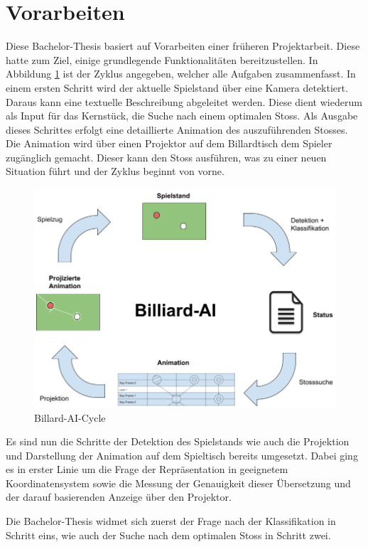 \section{Vorarbeiten}\label{kap:vorarbeiten}
Diese Bachelor-Thesis basiert auf Vorarbeiten einer früheren Projektarbeit. Diese hatte zum Ziel, einige
grundlegende Funktionalitäten bereitzustellen. In Abbildung \ref{fig:billiard_ai_cycle} ist der Zyklus angegeben,
welcher alle Aufgaben zusammenfasst. In einem ersten Schritt wird der aktuelle Spielstand über eine Kamera detektiert.
Daraus kann eine textuelle Beschreibung abgeleitet werden. Diese dient wiederum als Input für das Kernstück, die Suche
nach einem optimalen Stoss. Als Ausgabe dieses Schrittes erfolgt eine detaillierte Animation des auszuführenden Stosses.
Die Animation wird über einen Projektor auf dem Billardtisch dem Spieler zugänglich gemacht. Dieser kann den Stoss ausführen,
was zu einer neuen Situation führt und der Zyklus beginnt von vorne.

\begin{figure}[h!]
    \begin{center}
        \includegraphics[width=0.8\linewidth]{../common/03_billiard_ai/resources/19_billiard_ai_cycle.png}
    \end{center}
    \caption{Billard-AI-Cycle}
    \label{fig:billiard_ai_cycle}
\end{figure}

Es sind nun die Schritte der Detektion des Spielstands wie auch die Projektion und Darstellung der Animation auf dem
Spieltisch bereits umgesetzt. Dabei ging es in erster Linie um die Frage der Repräsentation in geeignetem Koordinatensystem
sowie die Messung der Genauigkeit dieser Übersetzung und der darauf basierenden Anzeige über den Projektor.

Die Bachelor-Thesis widmet sich zuerst der Frage nach der Klassifikation in Schritt eins, wie auch der Suche
nach dem optimalen Stoss in Schritt zwei.